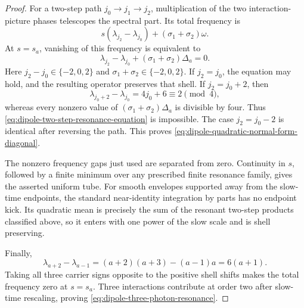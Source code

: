 \documentclass[11pt]{article}
\theoremstyle{remark}
\begin{document}
\begin{proof}
For a two-step path
$j_0\to j_1\to j_2$, multiplication of the two interaction-picture
phases telescopes the spectral part.  Its total frequency is
\[
 s(\lambda_{j_2}-\lambda_{j_0})
 +(\sigma_1+\sigma_2)\omega .
\]
At $s=s_a$, vanishing of this frequency is equivalent to
\begin{equation}
 \lambda_{j_2}-\lambda_{j_0}
 +(\sigma_1+\sigma_2)\Delta_a=0.
 \label{eq:dipole-two-step-resonance-equation}
\end{equation}
Here $j_2-j_0\in\{-2,0,2\}$ and
$\sigma_1+\sigma_2\in\{-2,0,2\}$.  If $j_2=j_0$, the equation may hold,
and the resulting operator preserves that shell.  If $j_2=j_0+2$, then
\[
 \lambda_{j_0+2}-\lambda_{j_0}=4j_0+6\equiv2\pmod4,
\]
whereas every nonzero value of
$(\sigma_1+\sigma_2)\Delta_a$ is divisible by four.  Thus
\eqref{eq:dipole-two-step-resonance-equation} is impossible.  The case
$j_2=j_0-2$ is identical after reversing the path.  This proves
\eqref{eq:dipole-quadratic-normal-form-diagonal}.

The nonzero frequency gaps just used are separated from zero.  Continuity in
$s$, followed by a finite minimum over any prescribed finite resonance family,
gives the asserted uniform tube.  For smooth envelopes supported away from
the slow-time endpoints, the standard near-identity integration by parts has
no endpoint kick.  Its quadratic mean is precisely the sum of the resonant
two-step products classified above, so it enters with one power of the slow
scale and is shell preserving.

Finally,
\[
 \lambda_{a+2}-\lambda_{a-1}
 =(a+2)(a+3)-(a-1)a=6(a+1).
\]
Taking all three carrier signs opposite to the positive shell shifts makes
the total frequency zero at $s=s_a$.  Three interactions contribute at order
two after slow-time rescaling, proving
\eqref{eq:dipole-three-photon-resonance}.
\end{proof}
\end{document}
